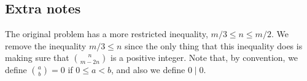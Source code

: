\documentclass{article}
\begin{document}
\subsection*{Extra notes}

The original problem has a more restricted inequality, $m/3 \leq n \leq m/2$.
We remove the inequality $m/3 \leq n$ since the only thing that this inequality does is making sure that $\binom{n}{m - 2n}$ is a positive integer.
Note that, by convention, we define $\binom{a}{b} = 0$ if $0 \leq a < b$, and also we define $0 \mid 0$.
\end{document}
